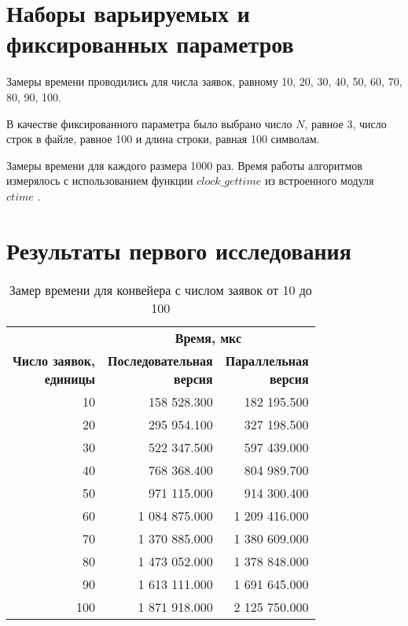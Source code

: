 \section*{Наборы варьируемых и фиксированных параметров}

Замеры времени проводились для числа заявок, равному 10, 20, 30, 40, 50, 60, 70, 80, 90, 100.

В качестве фиксированного параметра было выбрано число $N$, равное 3, число строк в файле, равное 100 и длина строки, равная 100 символам.

\clearpage

Замеры времени для каждого размера 1000 раз. Время работы алгоритмов измерялось с использованием функции $clock\_gettime$ из встроенного модуля $ctime$ \cite{cpu_time_func}.  

\section*{Результаты первого исследования}

\begin{table}[ht]
	\small
	\begin{center}
		\begin{threeparttable}
			\caption{Замер времени для конвейера с числом заявок от 10 до 100}
			\label{tbl:time}
			\begin{tabular}{|r|r|r|}
				\hline
				& \multicolumn{2}{c|}{\bfseries Время, мкс} \\ \cline{2-3}
				\bfseries \makecell{Число заявок, \\ единицы} & \bfseries \makecell{Последовательная \\ версия} & \bfseries \makecell{Параллельная \\ версия} \\ \cline{2-3}
				\hline
				10 & 158 528.300 & 182 195.500 \\
				\hline
				20 & 295 954.100 & 327 198.500 \\
				\hline
				30 & 522 347.500 & 597 439.000  \\
				\hline
				40 & 768 368.400 & 804 989.700 \\
				\hline
				50 & 971 115.000 & 914 300.400  \\
				\hline
				60 & 1 084 875.000 & 1 209 416.000  \\
				\hline
				70 & 1 370 885.000 & 1 380 609.000  \\
				\hline
				80 & 1 473 052.000 & 1 378 848.000  \\
				\hline
				90 & 1 613 111.000 & 1 691 645.000  \\
				\hline
				100 & 1 871 918.000 & 2 125 750.000  \\
				\hline
			\end{tabular}	
		\end{threeparttable}
	\end{center}
\end{table}


